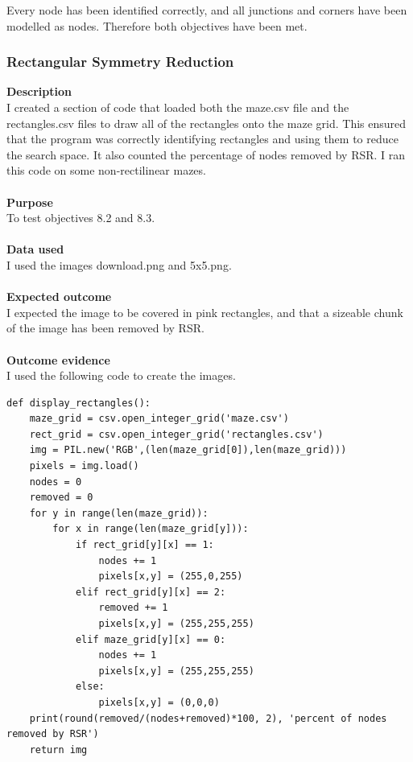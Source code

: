 \documentclass[titlepage]{article}
\begin{document}
Every node has been identified correctly, and all junctions and corners have been modelled as nodes. Therefore both objectives have been met.

\subsubsection{Rectangular Symmetry Reduction}
\textbf{Description}\\
I created a section of code that loaded both the maze.csv file and the rectangles.csv files to draw all of the rectangles onto the maze grid. This ensured that the program was correctly identifying rectangles and using them to reduce the search space. It also counted the percentage of nodes removed by RSR. I ran this code on some non-rectilinear mazes.\\\\
\textbf{Purpose}\\
To test objectives 8.2 and 8.3.\\\\
\textbf{Data used} \\
I used the images download.png and 5x5.png.\\\\
\textbf{Expected outcome}\\
I expected the image to be covered in pink rectangles, and that a sizeable chunk of the image has been removed by RSR.\\\\
\textbf{Outcome evidence}\\
I used the following code to create the images.

\begin{changemargin}{-1in}{-1in} 
\begin{verbatim}
def display_rectangles():
    maze_grid = csv.open_integer_grid('maze.csv')
    rect_grid = csv.open_integer_grid('rectangles.csv')
    img = PIL.new('RGB',(len(maze_grid[0]),len(maze_grid)))
    pixels = img.load()
    nodes = 0
    removed = 0
    for y in range(len(maze_grid)):
        for x in range(len(maze_grid[y])):
            if rect_grid[y][x] == 1:
                nodes += 1
                pixels[x,y] = (255,0,255)
            elif rect_grid[y][x] == 2:
                removed += 1
                pixels[x,y] = (255,255,255)
            elif maze_grid[y][x] == 0:
                nodes += 1
                pixels[x,y] = (255,255,255)
            else:
                pixels[x,y] = (0,0,0)
    print(round(removed/(nodes+removed)*100, 2), 'percent of nodes removed by RSR')
    return img
\end{verbatim}
\end{changemargin} 
\end{document}
